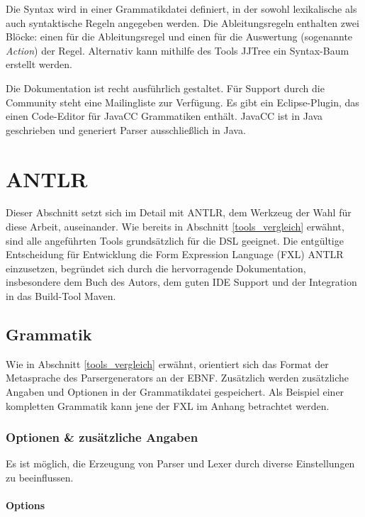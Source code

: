 Die Syntax wird in einer Grammatikdatei definiert, in der sowohl lexikalische als auch syntaktische Regeln angegeben werden. Die Ab\-lei\-tungs\-re\-geln enthalten zwei Blöcke: einen für die Ab\-lei\-tungs\-re\-gel und einen für die Auswertung (sogenannte \emph{Action}) der Regel. Alternativ kann mithilfe des Tools JJTree ein Syntax-Baum erstellt werden.

Die Dokumentation ist recht ausführlich gestaltet. Für Support durch die Community steht eine Mailingliste zur Verfügung. Es gibt ein Eclipse-Plugin, das einen Code-Editor für JavaCC Grammatiken enthält. JavaCC ist in Java geschrieben und generiert Parser ausschließlich in Java.





\section{ANTLR}
\label{tools_antlr}
Dieser Abschnitt setzt sich im Detail mit ANTLR, dem Werkzeug der Wahl für diese Arbeit, auseinander. Wie bereits in Abschnitt \ref{tools_vergleich} erwähnt, sind alle angeführten Tools grundsätzlich für die DSL geeignet. Die entgültige Entscheidung für Entwicklung die Form Expression Language (FXL) ANTLR einzusetzen, begründet sich durch die hervorragende Dokumentation, insbesondere dem Buch des Autors, dem guten IDE Support und der Integration in das Build-Tool Maven.


\subsection{Grammatik}

Wie in Abschnitt \ref{tools_vergleich} erwähnt, orientiert sich das Format der Metasprache des Parsergenerators an der EBNF. Zu\-sätz\-lich werden zusätzliche Angaben und Optionen in der Grammatikdatei gespeichert. Als Beispiel einer kompletten Grammatik kann jene der FXL im Anhang betrachtet werden.

\subsubsection{Optionen \& zusätzliche Angaben}

Es ist möglich, die Erzeugung von Parser und Lexer durch diverse Einstellungen zu beeinflussen.

\paragraph{Options}

